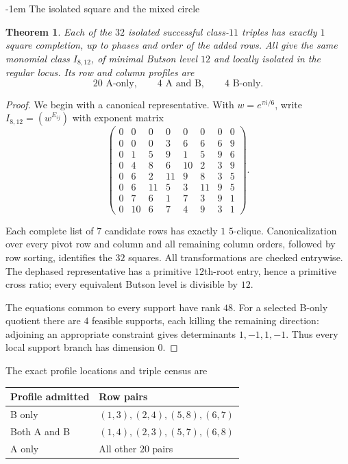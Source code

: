 \documentclass[11pt,a4paper]{article}
\makeatletter
\newtheorem{theorem}{Theorem}[section]
\theoremstyle{plain}
\theoremstyle{definition}
\numberwithin{equation}{section}
\renewcommand\subsection{\@startsection{subsection}{2}{\z@}  {\medskipamount}  {-1em}  {\normalfont\normalsize\bfseries}}
\makeatother
\begin{document}
\subsection{The isolated square and the mixed circle}\label{sec:i12}\label{sec:mixedcircle}
\begin{theorem}\label{thm:isolated}
Each of the $32$ isolated successful class-$11$ triples has exactly $1$ square completion, up to phases and order of the added rows. All give the same monomial class $I_{8,12}$, of minimal Butson level $12$ and locally isolated in the regular locus. Its row and column profiles are
$$20\text{ A-only},\qquad4\text{ A and B},\qquad4\text{ B-only}.$$
\end{theorem}
\begin{proof}
We begin with a canonical representative. With $w=e^{\pi i/6}$, write $I_{8,12}=(w^{E_{ij}})$ with exponent matrix
$$
\begin{pmatrix}
0 & 0 & 0 & 0 & 0 & 0 & 0 & 0 \\
0 & 0 & 0 & 3 & 6 & 6 & 6 & 9 \\
0 & 1 & 5 & 9 & 1 & 5 & 9 & 6 \\
0 & 4 & 8 & 6 & 10 & 2 & 3 & 9 \\
0 & 6 & 2 & 11 & 9 & 8 & 3 & 5 \\
0 & 6 & 11 & 5 & 3 & 11 & 9 & 5 \\
0 & 7 & 6 & 1 & 7 & 3 & 9 & 1 \\
0 & 10 & 6 & 7 & 4 & 9 & 3 & 1
\end{pmatrix}.
$$

Each complete list of $7$ candidate rows has exactly $1$ $5$-clique. Canonicalization over every pivot row and column and all remaining column orders, followed by row sorting, identifies the $32$ squares. All transformations are checked entrywise. The dephased representative has a primitive $12$th-root entry, hence a primitive cross ratio; every equivalent Butson level is divisible by $12$.

The equations common to every support have rank $48$. For a selected B-only quotient there are $4$ feasible supports, each killing the remaining direction: adjoining an appropriate constraint gives determinants $1,-1,1,-1$. Thus every local support branch has dimension $0$.
\end{proof}
The exact profile locations and triple census are
\begin{center}\begin{tabular}{ll}\toprule
Profile admitted&Row pairs\\\midrule
B only&$(1,3),(2,4),(5,8),(6,7)$\\
Both A and B&$(1,4),(2,3),(5,7),(6,8)$\\
A only&All other $20$ pairs\\\bottomrule
\end{tabular}\end{center}
\end{document}
